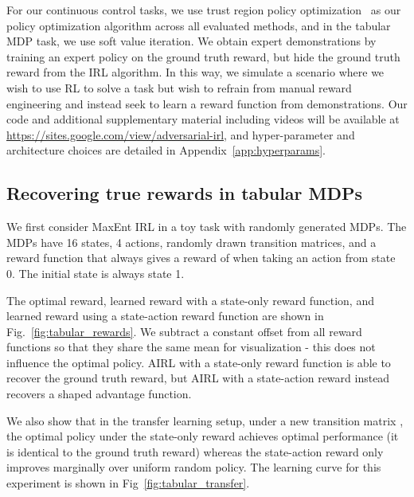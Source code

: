 \documentclass{article} \usepackage{iclr2018_conference,times}
\begin{document}
For our continuous control tasks, we use trust region policy optimization~\citep{Schulman15} as our policy optimization algorithm across all evaluated methods, and in the tabular MDP task, we use soft value iteration. We obtain expert demonstrations by training an expert policy on the ground truth reward, but hide the ground truth reward from the IRL algorithm. In this way, we simulate a scenario where we wish to use RL to solve a task but wish to refrain from manual reward engineering and instead seek to learn a reward function from demonstrations. Our code and additional supplementary material including videos will be available at \url{https://sites.google.com/view/adversarial-irl}, and hyper-parameter and architecture choices are detailed in Appendix~\ref{app:hyperparams}.

\subsection{Recovering true rewards in tabular MDPs}

We first consider MaxEnt IRL in a toy task with randomly generated MDPs. The MDPs have 16 states, 4 actions, randomly drawn transition matrices, and a reward function that always gives a reward of  when taking an action from state 0. The initial state is always state 1.

The optimal reward, learned reward with a state-only reward function, and learned reward using a state-action reward function are shown in Fig.~\ref{fig:tabular_rewards}. We subtract a constant offset from all reward functions so that they share the same mean for visualization - this does not influence the optimal policy. AIRL with a state-only reward function is able to recover the ground truth reward, but AIRL with a state-action reward instead recovers a shaped advantage function.

We also show that in the transfer learning setup, under a new transition matrix , the optimal policy under the state-only reward achieves optimal performance (it is identical to the ground truth reward) whereas the state-action reward only improves marginally over uniform random policy. The learning curve for this experiment is shown in Fig~\ref{fig:tabular_transfer}.
\end{document}

